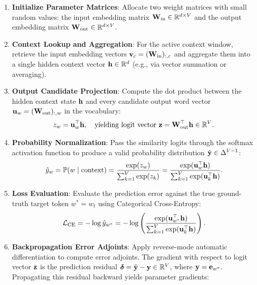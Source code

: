 \documentclass[../../main.tex]{subfiles}
\begin{document}
\begin{enumerate}
    \item \textbf{Initialize Parameter Matrices}: Allocate two weight matrices with small random values: the input embedding matrix $\mathbf{W}_{\text{in}} \in \mathbb{R}^{d \times V}$ and the output embedding matrix $\mathbf{W}_{\text{out}} \in \mathbb{R}^{d \times V}$.
    \item \textbf{Context Lookup and Aggregation}: For the active context window, retrieve the input embedding vectors $\mathbf{v}_c = (\mathbf{W}_{\text{in}})_{:, c}$ and aggregate them into a single hidden context vector $\mathbf{h} \in \mathbb{R}^d$ (e.g., via vector summation or averaging).
    \item \textbf{Output Candidate Projection}: Compute the dot product between the hidden context state $\mathbf{h}$ and every candidate output word vector $\mathbf{u}_w = (\mathbf{W}_{\text{out}})_{:, w}$ in the vocabulary:
    \begin{equation}
    \label{eq:logit_scoring}
    z_w = \mathbf{u}_w^\top \mathbf{h}, \quad \text{yielding logit vector } \mathbf{z} = \mathbf{W}_{\text{out}}^\top \mathbf{h} \in \mathbb{R}^V.
    \end{equation}
    \item \textbf{Probability Normalization}: Pass the similarity logits through the softmax activation function to produce a valid probability distribution $\hat{\mathbf{y}} \in \Delta^{V-1}$:
    \begin{equation}
    \label{eq:softmax_pred}
    \hat{y}_w = \mathbb{P}(w \mid \text{context}) = \frac{\exp(z_w)}{\sum_{k=1}^V \exp(z_k)} = \frac{\exp(\mathbf{u}_w^\top \mathbf{h})}{\sum_{k=1}^V \exp(\mathbf{u}_k^\top \mathbf{h})}.
    \end{equation}
    \item \textbf{Loss Evaluation}: Evaluate the prediction error against the true ground-truth target token $w^* = w_t$ using Categorical Cross-Entropy:
    \begin{equation}
    \label{eq:ce_loss}
    \mathcal{L}_{\text{CE}} = -\log \hat{y}_{w^*} = -\log \left( \frac{\exp(\mathbf{u}_{w^*}^\top \mathbf{h})}{\sum_{k=1}^V \exp(\mathbf{u}_k^\top \mathbf{h})} \right).
    \end{equation}
    \item \textbf{Backpropagation Error Adjoints}: Apply reverse-mode automatic differentiation to compute error adjoints. The gradient with respect to logit vector $\mathbf{z}$ is the prediction residual $\boldsymbol{\delta} = \hat{\mathbf{y}} - \mathbf{y} \in \mathbb{R}^V$, where $\mathbf{y} = \mathbf{e}_{w^*}$. Propagating this residual backward yields parameter gradients:
    \begin{equation}
    \label{eq:param_gradients}

\end{equation}
\end{enumerate}
\end{document}
